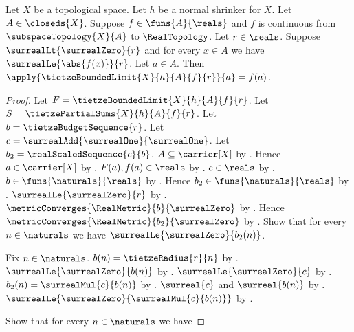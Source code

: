 \begin{theorem}\label{tietze_bounded_limit_agrees_on_subspace}
    Let $X$ be a topological space.
    Let $h$ be a normal shrinker for $X$.
    Let $A\in\closeds{X}$.
    Suppose $f\in\funs{A}{\reals}$ and $f$ is continuous from
        $\subspaceTopology{X}{A}$ to $\RealTopology$.
    Let $r\in\reals$.
    Suppose $\surrealLt{\surrealZero}{r}$ and
        for every $x\in A$ we have $\surrealLe{\abs{f(x)}}{r}$.
    Let $a\in A$.
    Then $\apply{\tietzeBoundedLimit{X}{h}{A}{f}{r}}{a}=f(a)$.
\end{theorem}
\begin{proof}
    Let $F=\tietzeBoundedLimit{X}{h}{A}{f}{r}$.
    Let $S=\tietzePartialSums{X}{h}{A}{f}{r}$.
    Let $b=\tietzeBudgetSequence{r}$.
    Let $c=\surrealAdd{\surrealOne}{\surrealOne}$.
    Let $b_2=\realScaledSequence{c}{b}$.
    $A\subseteq\carrier[X]$ by .
    Hence $a\in\carrier[X]$ by .
    $F(a),f(a)\in\reals$
        by .
    $c\in\reals$
        by .
    $b\in\funs{\naturals}{\reals}$
        by .
    Hence $b_2\in\funs{\naturals}{\reals}$
        by .
    $\surrealLe{\surrealZero}{r}$
        by
        .
    $\metricConverges{\RealMetric}{b}{\surrealZero}$
        by .
    Hence $\metricConverges{\RealMetric}{b_2}{\surrealZero}$
        by .
    Show that for every $n\in\naturals$ we have
        $\surrealLe{\surrealZero}{b_2(n)}$.
    \begin{subproof}
        Fix $n\in\naturals$.
        $b(n)=\tietzeRadius{r}{n}$
            by .
        $\surrealLe{\surrealZero}{b(n)}$
            by .
        $\surrealLe{\surrealZero}{c}$
            by
            .
        $b_2(n)=\surrealMul{c}{b(n)}$
            by .
        $\surreal{c}$ and $\surreal{b(n)}$
            by .
        $\surrealLe{\surrealZero}{\surrealMul{c}{b(n)}}$
            by .
    \end{subproof}
    Show that for every $n\in\naturals$ we have

\end{proof}
